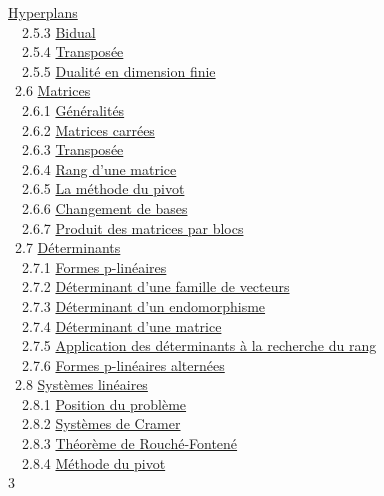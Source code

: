 \documentclass[]{article}
\begin{document}
\href{coursse11.html\#x16-770002.5.2}{Hyperplans} \\ ~~2.5.3
\href{coursse11.html\#x16-780002.5.3}{Bidual} \\ ~~2.5.4
\href{coursse11.html\#x16-790002.5.4}{Transposée} \\ ~~2.5.5
\href{coursse11.html\#x16-800002.5.5}{Dualité en dimension finie} \\
~2.6 \href{coursse12.html\#x17-810002.6}{Matrices} \\ ~~2.6.1
\href{coursse12.html\#x17-820002.6.1}{Généralités} \\ ~~2.6.2
\href{coursse12.html\#x17-830002.6.2}{Matrices carrées} \\ ~~2.6.3
\href{coursse12.html\#x17-840002.6.3}{Transposée} \\ ~~2.6.4
\href{coursse12.html\#x17-850002.6.4}{Rang d'une matrice} \\ ~~2.6.5
\href{coursse12.html\#x17-860002.6.5}{La méthode du pivot} \\ ~~2.6.6
\href{coursse12.html\#x17-870002.6.6}{Changement de bases} \\ ~~2.6.7
\href{coursse12.html\#x17-880002.6.7}{Produit des matrices par blocs} \\
~2.7 \href{coursse13.html\#x18-890002.7}{Déterminants} \\ ~~2.7.1
\href{coursse13.html\#x18-900002.7.1}{Formes p-linéaires} \\ ~~2.7.2
\href{coursse13.html\#x18-910002.7.2}{Déterminant d'une famille de
vecteurs} \\ ~~2.7.3 \href{coursse13.html\#x18-920002.7.3}{Déterminant
d'un endomorphisme} \\ ~~2.7.4
\href{coursse13.html\#x18-930002.7.4}{Déterminant d'une matrice} \\
~~2.7.5 \href{coursse13.html\#x18-940002.7.5}{Application des
déterminants à la recherche du rang} \\ ~~2.7.6
\href{coursse13.html\#x18-950002.7.6}{Formes p-linéaires alternées} \\
~2.8 \href{coursse14.html\#x19-960002.8}{Systèmes linéaires} \\ ~~2.8.1
\href{coursse14.html\#x19-970002.8.1}{Position du problème} \\ ~~2.8.2
\href{coursse14.html\#x19-980002.8.2}{Systèmes de Cramer} \\ ~~2.8.3
\href{coursse14.html\#x19-990002.8.3}{Théorème de Rouché-Fontené} \\
~~2.8.4 \href{coursse14.html\#x19-1000002.8.4}{Méthode du pivot} \\ 3
\end{document}
